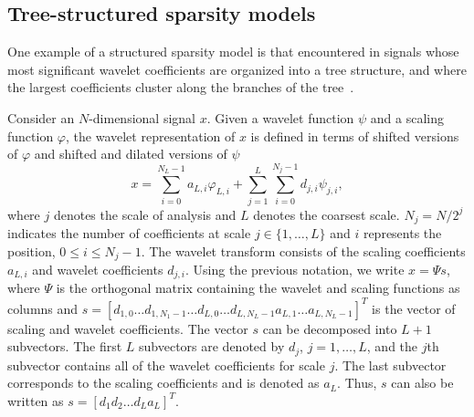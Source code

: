 \documentclass[journal]{IEEEtran}
\begin{document}
\subsection{Tree-structured sparsity models}
One example of a structured sparsity model is that encountered in signals whose most significant wavelet coefficients are organized into a tree structure, and where the largest coefficients cluster along the branches of the tree~\cite{Bara10}.

Consider an $N$-dimensional signal $x$. Given a wavelet function $\psi$ and a scaling function $\varphi$, the wavelet representation of $x$ is defined in terms of shifted versions of $\varphi$ and shifted and dilated versions of $\psi$
\begin{equation}
x=\displaystyle\sum\limits_{i=0}^{N_L-1} a_{L,i}\varphi_{L,i}+\displaystyle\sum\limits_{j=1}^{L}\displaystyle\sum\limits_{i=0}^{N_j-1}d_{j,i}\psi_{j,i},
\end{equation}
where $j$ denotes the scale of analysis and $L$ denotes the coarsest scale. $N_j=N/2^j$ indicates the number of coefficients at scale $j\in\{1,\ldots,L\}$ and $i$ represents the position, $0\leq i\leq N_j-1$. The wavelet transform consists of the scaling coefficients $a_{L,i}$ and wavelet coefficients $d_{j,i}$. Using the previous notation, we write $x=\Psi s$, where $\Psi$ is the orthogonal matrix containing the wavelet and scaling functions as columns and $s=[d_{1,0} \ldots d_{1,N_1-1} \ldots d_{L,0} \ldots d_{L,N_L-1} a_{L,1} \ldots a_{L,N_L-1}]^T$ is the vector of scaling and wavelet coefficients. The vector $s$ can be decomposed into $L+1$ subvectors. The first $L$ subvectors are denoted by $d_j$, $j=1,\ldots,L$, and the $j$th subvector contains all of the wavelet coefficients for scale $j$. The last subvector corresponds to the scaling coefficients and is denoted as $a_L$. Thus, $s$ can also be written as $s=[d_1 d_2 \ldots d_L a_L]^T$.
\end{document}

